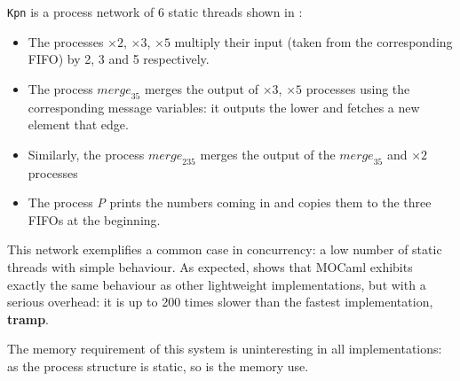 \documentclass[12pt,twoside,notitlepage]{report}
\theoremstyle{plain}%
\theoremstyle{definition}
\theoremstyle{remark}
\begin{document}
\verb|Kpn| is a process network of 6 static threads shown in :
\begin{itemize}
\item{The processes $ \times \textit{2} $, $ \times \textit{3} $, $ \times \textit{5} $ multiply their input (taken from the corresponding FIFO) by 2, 3 and 5 respectively.}
\item{The process $ \textit{merge}_{35} $ merges the output of $ \times \textit{3} $, $ \times \textit{5} $ processes using the corresponding message variables: it outputs the lower and fetches a new element that edge.}
\item{Similarly, the process $ \textit{merge}_{235} $ merges the output of the $ \textit{merge}_{35} $ and $ \times \textit{2} $ processes}
\item{The process \textit{P} prints the numbers coming in and copies them to the three FIFOs at the beginning.}
\end{itemize}
This network exemplifies a common case in concurrency: a low number of static threads with simple behaviour. As expected,  shows that MOCaml exhibits exactly the same behaviour as other lightweight implementations, but with a serious overhead: it is up to 200 times slower than the fastest implementation, \textbf{tramp}.  

The memory requirement of this system is uninteresting in all implementations: as the process structure is static, so is the memory use.
\end{document}
